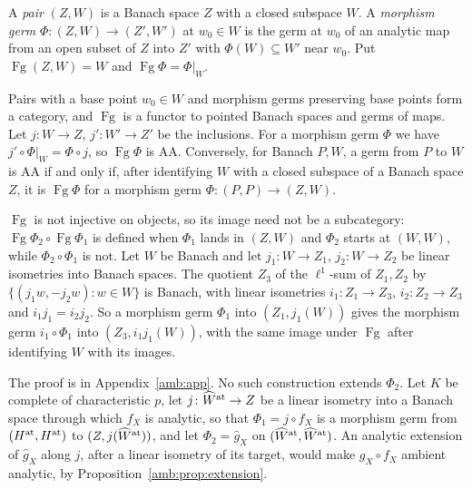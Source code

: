 \begin{definition}[pairs]\label{amb:def:pairs}
A \emph{pair} $(Z,W)$ is a Banach space $Z$ with a closed subspace $W$. A \emph{morphism germ} $\Phi\colon(Z,W)\to(Z',W')$ at $w_0\in W$ is the germ at $w_0$ of an analytic map from an open subset of $Z$ into $Z'$ with $\Phi(W)\subseteq W'$ near $w_0$. Put $\operatorname{Fg}(Z,W)=W$ and $\operatorname{Fg}\Phi=\Phi|_W$.
\end{definition}

\begin{proposition}\label{amb:prop:pairs}
Pairs with a base point $w_0\in W$ and morphism germs preserving base points form a category, and $\operatorname{Fg}$ is a functor to pointed Banach spaces and germs of maps. Let $j\colon W\to Z$, $j'\colon W'\to Z'$ be the inclusions. For a morphism germ $\Phi$ we have $j'\circ\Phi|_W=\Phi\circ j$, so $\operatorname{Fg}\Phi$ is AA. Conversely, for Banach $P,W$, a germ from $P$ to $W$ is AA if and only if, after identifying $W$ with a closed subspace of a Banach space $Z$, it is $\operatorname{Fg}\Phi$ for a morphism germ $\Phi\colon(P,P)\to(Z,W)$.

$\operatorname{Fg}$ is not injective on objects, so its image need not be a subcategory: $\operatorname{Fg}\Phi_2\circ\operatorname{Fg}\Phi_1$ is defined when $\Phi_1$ lands in $(Z,W)$ and $\Phi_2$ starts at $(W,W)$, while $\Phi_2\circ\Phi_1$ is not. Let $W$ be Banach and let $j_1\colon W\to Z_1$, $j_2\colon W\to Z_2$ be linear isometries into Banach spaces. The quotient $Z_3$ of the $\ell^1$-sum of $Z_1,Z_2$ by $\{(j_1w,-j_2w):w\in W\}$ is Banach, with linear isometries $i_1\colon Z_1\to Z_3$, $i_2\colon Z_2\to Z_3$ and $i_1j_1=i_2j_2$. So a morphism germ $\Phi_1$ into $(Z_1,j_1(W))$ gives the morphism germ $i_1\circ\Phi_1$ into $(Z_3,i_1j_1(W))$, with the same image under $\operatorname{Fg}$ after identifying $W$ with its images.
\end{proposition}
The proof is in Appendix~\ref{amb:app}. No such construction extends $\Phi_2$. Let $K$ be complete of characteristic $p$, let $j\colon\widehat W^{\rm at}\to Z$ be a linear isometry into a Banach space through which $f_X$ is analytic, so that $\Phi_1=j\circ f_X$ is a morphism germ from $(H^{\rm at},H^{\rm at})$ to $(Z,j(\widehat W^{\rm at}))$, and let $\Phi_2=\hat g_X$ on $(\widehat W^{\rm at},\widehat W^{\rm at})$. An analytic extension of $\hat g_X$ along $j$, after a linear isometry of its target, would make $g_X\circ f_X$ ambient analytic, by Proposition~\ref{amb:prop:extension}.

